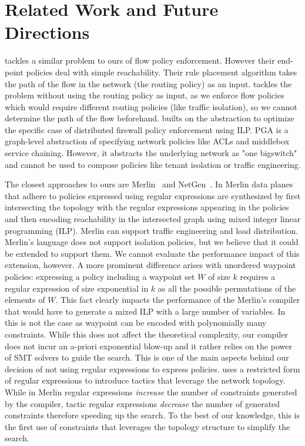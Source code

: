 \section{Related Work and Future Directions} \label{sec:relatedwork}

\cite{oneswitch} tackles a similar problem to ours of flow policy
enforcement. However their end-point policies deal with simple
reachability. Their rule placement algorithm takes the path of the
flow in the network  (the routing policy) as an input.%
\Name tackles the
problem without using the routing policy as input, as we enforce flow
policies which would require different routing policies (like traffic
isolation), so we cannot determine the path of the flow
beforehand. %
\cite{distfirewall} builts on the
\cite{oneswitch} abstraction to optimize the specific case of
distributed firewall policy enforcement using ILP.  PGA \cite{pga} is
a graph-level abstraction of specifying network policies like ACLs and
middlebox service chaining. However, it abstracts the underlying
network as "one bigswitch" and cannot be used to compose policies like
tenant isolation or traffic engineering.

The closest approaches to ours are Merlin~\cite{merlin} and
NetGen~\cite{netgen}.  In Merlin data planes that adhere to policies
expressed using regular expressions are synthesized by first
intersecting the topology with the regular expressions appearing in
the policies and then encoding reachability in the intersected graph
using mixed integer linear programming (ILP).
Merlin can support traffic engineering and load distribution.
Merlin's language does not support isolation policies, but we believe
that it could be extended to support them.  We cannot evaluate the
performance impact of this extension, however.  A more prominent
difference arises with unordered waypoint policies: expressing a
policy including a waypoint set $W$ of size $k$ requires a regular
expression of size exponential in $k$ as all the possible permutations
of the elements of $W$. This fact clearly impacts the performance of
the Merlin's compiler that would have to generate a mixed ILP with a
large number of variables.  In \Name this is not the case as waypoint
can be encoded with polynomially many constraints.  While this does
not affect the theoretical complexity, our compiler does not incur
an a-priori exponential blow-up and it rather relies on the power
of SMT solvers to guide the search.  This is one of the main aspects
behind our decision of not using regular expressions to express
policies.  \Name uses a restricted form of regular expressions to
introduce tactics that leverage the network topology.  While in Merlin
regular expressions \emph{increase} the number of constraints
generated by the compiler, tactic regular expressions \emph{decrease}
the number of generated constraints therefore speeding up the search.
To the best of our knowledge, this is the first use of constraints
that leverages the topology structure to simplify the search.

